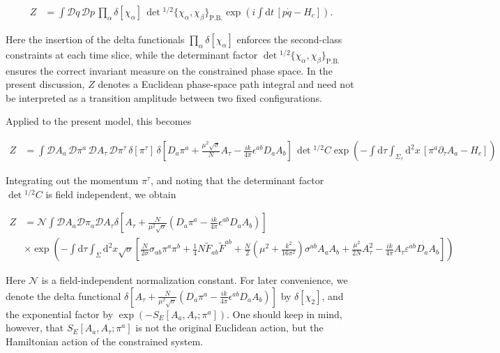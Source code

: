 \begin{align}
Z & =\int \mathcal{D}q\,\mathcal{D}p\,\prod _{\alpha}\delta [\chi _{\alpha}]\,\det {}^{1/2}\!\big\{\chi _{\alpha},\chi _{\beta}\big\}_{\mathrm{P.B.}}\exp \left(i\int \mathrm{d}t\,[p\dot{q}-H_{c}]\right).
\end{align}

Here the insertion of the delta functionals $\displaystyle{\prod _{\alpha}\delta [\chi _{\alpha}]}$ enforces the second-class constraints at each time slice, while the determinant factor $\displaystyle{\det {}^{1/2}\!\big\{\chi _{\alpha},\chi _{\beta}\big\}_{\mathrm{P.B.}}}$ ensures the correct invariant measure on the constrained phase space. In the present discussion, $\displaystyle{Z}$ denotes a Euclidean phase-space path integral and need not be interpreted as a transition amplitude between two fixed configurations.

Applied to the present model, this becomes

\begin{align}
Z & =\int \mathcal{D}A_{a}\,\mathcal{D}\pi ^{a}\,\mathcal{D}A_{\tau}\,\mathcal{D}\pi ^{\tau}\,\delta [\pi ^{\tau}]\,\delta \left[ D_{a}\pi ^{a}+\frac{\mu ^{2}\sqrt{ \sigma }}{N}A_{\tau}-\frac{ik}{4\pi}\epsilon ^{ab}D_{a}A_{b} \right]\,\det {}^{1/2} C \exp \left(-\int \mathrm{d}\tau\int _{\Sigma _{\tau}}\mathrm{d}^{2}x\,[\pi ^{a}\partial _{\tau}A_{a}-H_{c}]\right)
\end{align}

Integrating out the momentum $\displaystyle{\pi ^{\tau}}$, and noting that the determinant factor $\displaystyle{\det {}^{1/2} C}$ is field independent, we obtain

\begin{align}
Z & =\mathcal{N}\int \mathcal{D}A_{a}\mathcal{D}\pi _{a}\mathcal{D}A_{\tau} \delta\left[ A_{\tau}+\frac{N}{\mu ^{2}\sqrt{ \sigma }}\left(D_{a}\pi ^{a}-\frac{ik}{4\pi}\epsilon ^{ab}D_{a}A_{b}\right)\right] \\
 & \times \exp\left(-\int \mathrm{d}\tau \int _{\Sigma}\mathrm{d}^{2}x\sqrt{ \sigma }\left[\frac{N}{2\sigma}\sigma _{ab}\pi ^{a}\pi ^{b}+\frac{1}{4}N\tilde{F}_{ab}\tilde{F}^{ab}+\frac{N}{2}\left(\mu ^{2}+\frac{k^{2}}{16\pi ^{2}}\right)\sigma ^{ab}A_{a}A_{b}+\frac{\mu ^{2}}{2N}A_{\tau}^{2}-\frac{ik}{4\pi}A_{\tau}\varepsilon ^{ab}D_{a}A_{b}\right]\right)
\end{align}

Here $\displaystyle{\mathcal{N}}$ is a field-independent normalization constant. For later convenience, we denote the delta functional $\displaystyle{\delta\left[ A_{\tau}+\frac{N}{\mu ^{2}\sqrt{ \sigma }}\left(D_{a}\pi ^{a}-\frac{ik}{4\pi}\epsilon ^{ab}D_{a}A_{b}\right)\right]}$ by $\displaystyle{\delta [\chi_{2}]}$, and the exponential factor by $\displaystyle{\exp(-S_{E}[A_{a},A_{\tau};\pi ^{a}])}$. One should keep in mind, however, that $\displaystyle{S_{E}[A_{a},A_{\tau};\pi ^{a}]}$ is not the original Euclidean action, but the Hamiltonian action of the constrained system.

